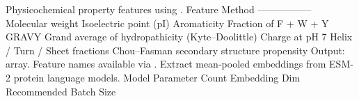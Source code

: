 {}\markdownRendererThematicBreak{}\markdownRendererInterblockSeparator
{}
\markdownRendererSectionEnd \markdownRendererSectionBegin
{}\markdownRendererInterblockSeparator
{} Physicochemical property features using .\markdownRendererParagraphSeparator
{}\markdownRendererPipe{} Feature \markdownRendererPipe{} Method \markdownRendererPipe{}\markdownRendererSoftLineBreak
{}\markdownRendererPipe{}---------\markdownRendererPipe{}--------\markdownRendererPipe{}\markdownRendererSoftLineBreak
{}\markdownRendererPipe{} Molecular weight \markdownRendererPipe{}  \markdownRendererPipe{}\markdownRendererSoftLineBreak
{}\markdownRendererPipe{} Isoelectric point (pI) \markdownRendererPipe{}  \markdownRendererPipe{}\markdownRendererSoftLineBreak
{}\markdownRendererPipe{} Aromaticity \markdownRendererPipe{} Fraction of F + W + Y \markdownRendererPipe{}\markdownRendererSoftLineBreak
{}\markdownRendererPipe{} GRAVY \markdownRendererPipe{} Grand average of hydropathicity (Kyte–Doolittle) \markdownRendererPipe{}\markdownRendererSoftLineBreak
{}\markdownRendererPipe{} Charge at pH 7 \markdownRendererPipe{}  \markdownRendererPipe{}\markdownRendererSoftLineBreak
{}\markdownRendererPipe{} Helix / Turn / Sheet fractions \markdownRendererPipe{} Chou–Fasman secondary structure propensity \markdownRendererPipe{}\markdownRendererParagraphSeparator
{}Output:  array. Feature names available via .\markdownRendererInterblockSeparator
{}\markdownRendererThematicBreak{}\markdownRendererInterblockSeparator
{}
\markdownRendererSectionEnd \markdownRendererSectionBegin
{}\markdownRendererInterblockSeparator
{} Extract mean-pooled embeddings from ESM-2 protein language models.\markdownRendererParagraphSeparator
{}\markdownRendererPipe{} Model \markdownRendererPipe{} Parameter Count \markdownRendererPipe{} Embedding Dim \markdownRendererPipe{} Recommended Batch Size \markdownRendererPipe{}\markdownRendererSoftLineBreak
